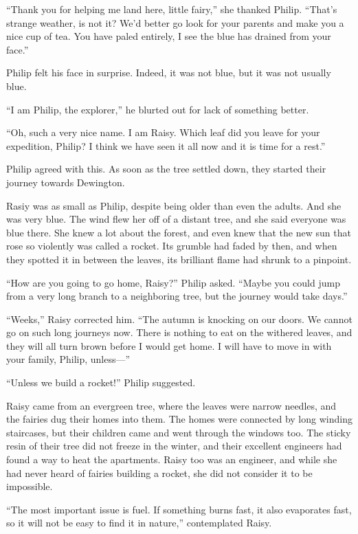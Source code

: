 \documentclass[10pt, draft]{memoir}
\begin{document}
``Thank you for helping me land here, little fairy,'' she thanked Philip.
``That's strange weather, is not it? We'd better go look for your parents and
make you a nice cup of tea. You have paled entirely, I see the blue has drained
from your face.''

Philip felt his face in surprise. Indeed, it was not blue, but it was not
usually blue.

``I am Philip, the explorer,'' he blurted out for lack of something better.

``Oh, such a very nice name. I am Raisy. Which leaf did you leave for your
expedition, Philip? I think we have seen it all now and it is time for a
rest.''

Philip agreed with this. As soon as the tree settled down, they started their
journey towards Dewington.

Rasiy was as small as Philip, despite being older than even the adults. And she
was very blue. The wind flew her off of a distant tree, and she said everyone
was blue there. She knew a lot about the forest, and even knew that the new sun
that rose so violently was called a rocket. Its grumble had faded by then, and
when they spotted it in between the leaves, its brilliant flame had shrunk to a
pinpoint.

``How are you going to go home, Raisy?'' Philip asked. ``Maybe you could jump
from a very long branch to a neighboring tree, but the journey would take
days.''

``Weeks,'' Raisy corrected him. ``The autumn is knocking on our doors. We
cannot go on such long journeys now. There is nothing to eat on the withered
leaves, and they will all turn brown before I would get home. I will have to
move in with your family, Philip, unless---''

``Unless we build a rocket!'' Philip suggested.

Raisy came from an evergreen tree, where the leaves were narrow needles, and
the fairies dug their homes into them. The homes were connected by long winding
staircases, but their children came and went through the windows too. The
sticky resin of their tree did not freeze in the winter, and their excellent
engineers had found a way to heat the apartments. Raisy too was an engineer,
and while she had never heard of fairies building a rocket, she did not
consider it to be impossible.

``The most important issue is fuel. If something burns fast, it also evaporates
fast, so it will not be easy to find it in nature,'' contemplated Raisy.
\end{document}
